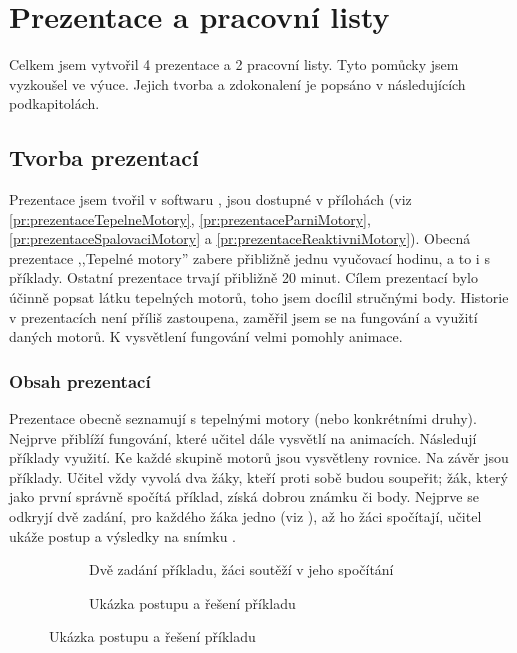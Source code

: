 \section{Prezentace a pracovní listy}\label{sc:prezentace}
{Celkem jsem vytvořil 4 prezentace a 2 pracovní listy. Tyto pomůcky jsem vyzkoušel ve výuce. Jejich tvorba a zdokonalení je popsáno v následujících podkapitolách.}
\subsection{Tvorba prezentací}
{Prezentace jsem tvořil v softwaru , jsou dostupné v přílohách (viz \ref{pr:prezentaceTepelneMotory}, \ref{pr:prezentaceParniMotory}, \ref{pr:prezentaceSpalovaciMotory} a \ref{pr:prezentaceReaktivniMotory}). Obecná prezentace ,,Tepelné motory'' zabere přibližně jednu vyučovací hodinu, a to i s příklady. Ostatní prezentace trvají přibližně 20 minut.}\odst
{Cílem prezentací bylo účinně popsat látku tepelných motorů, toho jsem docílil stručnými body. Historie v prezentacích není příliš zastoupena, zaměřil jsem se na fungování a využití daných motorů. K vysvětlení fungování velmi pomohly animace.}
\subsubsection{Obsah prezentací}
{Prezentace obecně seznamují s tepelnými motory (nebo konkrétními druhy). Nejprve přiblíží fungování, které učitel dále vysvětlí na animacích. Následují příklady využití. Ke každé skupině motorů jsou vysvětleny rovnice.}\odst
{Na závěr jsou příklady. Učitel vždy vyvolá dva žáky, kteří proti sobě budou soupeřit; žák, který jako první správně spočítá příklad, získá dobrou známku či body. Nejprve se odkryjí dvě zadání, pro každého žáka jedno (viz ), až ho žáci spočítají, učitel ukáže postup a výsledky na snímku .}
\begin{figure}[H]
    \begingroup
    \makeatletter
    \renewcommand\thesubfigure{\thefigure~--~\@nameuse{subfiglabel@\alph{subfigure}}}
    \newcommand{\subfiglabel@a}{vlevo}
    \newcommand{\subfiglabel@b}{vpravo}
    \captionsetup[subfigure]{labelformat=simple, labelsep=colon}
    \renewcommand\p@subfigure{}
    \makeatother
    \begin{subfigure}{0.45\textwidth}
        \centering
        \setlength{\fboxsep}{0pt}
        \caption{Dvě zadání příkladu, žáci soutěží v jeho spočítání \jaObr}
        \label{obr:prikladyZadani}
    \end{subfigure}\hfill
    \begin{subfigure}{0.45\textwidth}
        \centering
        \setlength{\fboxsep}{0pt}
        \caption{Ukázka postupu a řešení příkladu \jaObr}
        \label{obr:prikladyReseni}
    \end{subfigure}
    \endgroup
\end{figure}
\newpage

